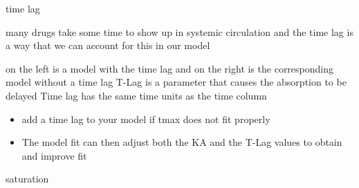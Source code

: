 \documentclass[
  letterpaper,
  DIV=11,
  numbers=noendperiod]{scrreprt}
\providecommand{\tightlist}{%
  \setlength{\itemsep}{0pt}\setlength{\parskip}{0pt}}\usepackage{longtable,booktabs,array}
\begin{document}
time lag

many drugs take some time to show up in systemic circulation and the
time lag is a way that we can account for this in our model

on the left is a model with the time lag and on the right is the
corresponding model without a time lag T-Lag is a parameter that causes
the absorption to be delayed Time lag has the same time units as the
time column

\begin{itemize}
\tightlist
\item
  add a time lag to your model if tmax does not fit properly
\item
  The model fit can then adjust both the KA and the T-Lag values to
  obtain and improve fit
\end{itemize}

saturation
\end{document}
